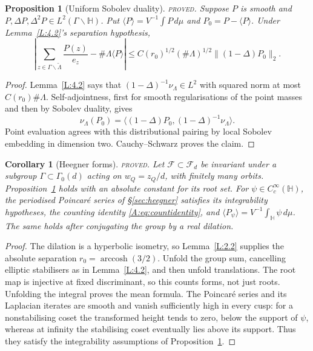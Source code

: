 \documentclass[10pt,reqno]{amsart}
\newtheorem{proposition}[theorem]{Proposition}
\newtheorem{corollary}[theorem]{Corollary}
\theoremstyle{definition}
\numberwithin{equation}{section}
\newcommand{\HH}{\mathbb H}
\newcommand{\cF}{\mathcal F}
\newcommand{\status}[1]{\textup{\textsc{#1}}}
\begin{document}
\begin{proposition}[Uniform Sobolev duality]\label{L:4.3}
\status{proved}. Suppose \(P\) is smooth and
\(P,\Delta P,\Delta^2P\in L^2(\Gamma\backslash\HH)\). Put
\(\langle P\rangle=V^{-1}\int P\,d\mu\) and
\(P_0=P-\langle P\rangle\). Under Lemma~\ref{L:4.2}'s separation hypothesis,
\[
 \left|\sum_{z\in\Gamma\backslash\widetilde\Lambda}\frac{P(z)}{e_z}
           -\#\Lambda\langle P\rangle\right|
 \le C(r_0)^{1/2}(\#\Lambda)^{1/2}\|(1-\Delta)P_0\|_2.
\]
\end{proposition}
\begin{proof}
Lemma~\ref{L:4.2} says that \((1-\Delta)^{-1}\nu_\Lambda\in L^2\)
with squared norm at most \(C(r_0)\#\Lambda\). Self-adjointness, first
for smooth regularisations of the point masses and then by Sobolev
duality, gives
\[
 \nu_\Lambda(P_0)=
 \langle(1-\Delta)P_0,(1-\Delta)^{-1}\nu_\Lambda\rangle.
\]
Point evaluation agrees with this distributional pairing by local
Sobolev embedding in dimension two. Cauchy--Schwarz proves the claim.
\end{proof}

\begin{corollary}[Heegner forms]\label{L:4.4}
\status{proved}. Let \(\cF\subset\cF_d\) be invariant under a subgroup
\(\Gamma\subset\Gamma_0(d)\) acting on \(w_Q=z_Q/d\), with finitely many
orbits. Proposition~\ref{L:4.3} holds with an absolute constant for its
root set. For $\psi\in C_c^\infty(\HH)$, the periodised Poincar\'e
series of \S\ref{sec:heegner} satisfies its integrability hypotheses,
the counting identity \eqref{A:eq:countidentity}, and
$\langle P_\psi\rangle=V^{-1}\int_{\HH}\psi\,d\mu$.
The same holds after conjugating the group by a real dilation.
\end{corollary}
\begin{proof}
The dilation is a hyperbolic isometry, so Lemma~\ref{L:2.2} supplies the
absolute separation \(r_0=\operatorname{arccosh}(3/2)\).
Unfold the group sum, cancelling elliptic stabilisers as in
Lemma~\ref{L:4.2}, and then unfold translations. The root map is
injective at fixed discriminant, so this counts forms, not just roots.
Unfolding the integral proves the mean formula. The Poincar\'e series
and its Laplacian iterates are smooth and vanish sufficiently high in
every cusp: for a nonstabilising coset the transformed height tends to
zero, below the support of \(\psi\), whereas at infinity the stabilising
coset eventually lies above its support. Thus they satisfy the
integrability assumptions of Proposition~\ref{L:4.3}.
\end{proof}
\end{document}
